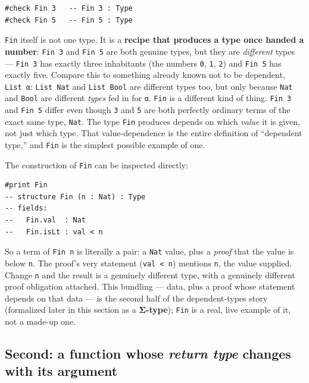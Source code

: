 \begin{lstlisting}
#check Fin 3   -- Fin 3 : Type
#check Fin 5   -- Fin 5 : Type
\end{lstlisting}

\texttt{Fin} itself is not one type. It is a \textbf{recipe that produces a type once handed a number}: \texttt{Fin 3} and \texttt{Fin 5} are both genuine types, but they are \emph{different} types --- \texttt{Fin 3} has exactly three inhabitants (the numbers \texttt{0}, \texttt{1}, \texttt{2}) and \texttt{Fin 5} has exactly five. Compare this to something already known not to be dependent, \texttt{List α}: \texttt{List Nat} and \texttt{List Bool} are different types too, but only because \texttt{Nat} and \texttt{Bool} are different \emph{types} fed in for \texttt{α}. \texttt{Fin} is a different kind of thing. \texttt{Fin 3} and \texttt{Fin 5} differ even though \texttt{3} and \texttt{5} are both perfectly ordinary terms of the exact same type, \texttt{Nat}. The type \texttt{Fin} produces depends on which \emph{value} it is given, not just which type. That value-dependence is the entire definition of ``dependent type,'' and \texttt{Fin} is the simplest possible example of one.

The construction of \texttt{Fin} can be inspected directly:

\begin{lstlisting}
#print Fin
-- structure Fin (n : Nat) : Type
-- fields:
--   Fin.val  : Nat
--   Fin.isLt : val < n
\end{lstlisting}

So a term of \texttt{Fin n} is literally a pair: a \texttt{Nat} value, plus a \emph{proof} that the value is below \texttt{n}. The proof's very statement (\texttt{val < n}) mentions \texttt{n}, the value supplied. Change \texttt{n} and the result is a genuinely different type, with a genuinely different proof obligation attached. This bundling --- data, plus a proof whose statement depends on that data --- is the second half of the dependent-types story (formalized later in this section as a \textbf{Σ-type}); \texttt{Fin} is a real, live example of it, not a made-up one.

\subsection{\texorpdfstring{Second: a function whose \emph{return type} changes with its argument}{Second: a function whose return type changes with its argument}}\label{sec:01-basics:03-dependent-types:5}

